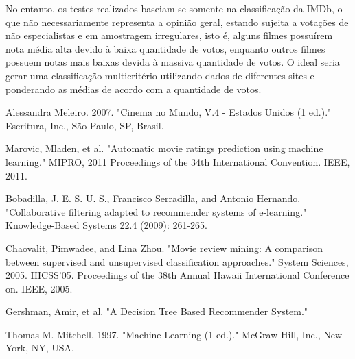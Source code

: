 \documentclass[twoside]{article}
\begin{document}
\begin{multicols}{2}
No entanto, os testes realizados baseiam-se somente na classificação da IMDb, o que não necessariamente representa a opinião geral, estando sujeita a votações de não especialistas e em amostragem irregulares, isto é, alguns filmes possuírem nota média alta devido à baixa quantidade de votos, enquanto outros filmes possuem notas mais baixas devida à massiva quantidade de votos. O ideal seria gerar uma classificação multicritério utilizando dados de diferentes sites e ponderando as médias de acordo com a quantidade de votos.


\begin{thebibliography}{9}


Alessandra Meleiro. 2007. "Cinema no Mundo, V.4 - Estados Unidos (1 ed.)." Escritura, Inc., São Paulo, SP, Brasil.

Marovic, Mladen, et al. "Automatic movie ratings prediction using machine learning." MIPRO, 2011 Proceedings of the 34th International Convention. IEEE, 2011.

Bobadilla, J. E. S. U. S., Francisco Serradilla, and Antonio Hernando. "Collaborative filtering adapted to recommender systems of e-learning." Knowledge-Based Systems 22.4 (2009): 261-265.

Chaovalit, Pimwadee, and Lina Zhou. "Movie review mining: A comparison between supervised and unsupervised classification approaches." System Sciences, 2005. HICSS'05. Proceedings of the 38th Annual Hawaii International Conference on. IEEE, 2005.

 Gershman, Amir, et al. "A Decision Tree Based Recommender System."
 
Thomas M. Mitchell. 1997. "Machine Learning (1 ed.)." McGraw-Hill, Inc., New York, NY, USA.

\end{thebibliography}

\end{multicols}
\end{document}
